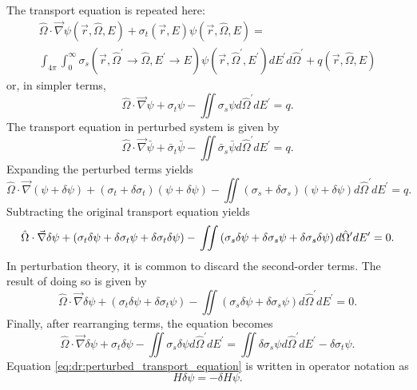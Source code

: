 The transport equation is repeated here:
\begin{multline*}
  \hat{\Omega}\cdot\vec{\nabla}\psi\left(\vec{r},\hat{\Omega},E\right) +
  \sigma_t\left(\vec{r},E\right)\psi\left(\vec{r},\hat{\Omega},E\right) = \\
  \int_{4\pi}\int_0^\infty\sigma_s\left(\vec{r},\hat{\Omega}^\prime\rightarrow\hat{\Omega},E^\prime\rightarrow E\right)\psi\left(\vec{r},\hat{\Omega}^\prime,E^\prime\right)dE^\prime d\hat{\Omega}^\prime +
  q\left(\vec{r},\hat{\Omega},E\right)
\end{multline*}
or, in simpler terms,
\begin{equation}\label{eq:dr:transport_equation_simple}
  \hat{\Omega}\cdot\vec{\nabla}\psi +
  \sigma_t\psi -
  \iint\sigma_s\psi d\hat{\Omega}^\prime dE^\prime =
  q.
\end{equation}
The transport equation in perturbed system is given by
\begin{equation}\label{eq:dr:transport_equation_perturbed}
  \hat{\Omega}\cdot\vec{\nabla}\bar{\psi} +
  \bar{\sigma}_t\bar{\psi} -
  \iint\bar{\sigma}_s\bar{\psi} d\hat{\Omega}^\prime dE^\prime =
  q.
\end{equation}
Expanding the perturbed terms yields
\begin{equation}\label{eq:dr:transport_equation_perturbed_2}
  \hat{\Omega}\cdot\vec{\nabla}\left(\psi + \delta\psi\right) +
  \left(\sigma_t + \delta\sigma_t\right)\left(\psi + \delta\psi\right) -
  \iint\left(\sigma_s + \delta\sigma_s\right)\left(\psi + \delta\psi\right)d\hat{\Omega}^\prime dE^\prime =
  q.
\end{equation}
Subtracting the original transport equation yields
\begin{equation}\label{eq:dr:transport_equation_perturbed_3}
  \hat{\Omega}\cdot\vec{\nabla}\delta\psi +
  \left(\sigma_t\delta\psi + \delta\sigma_t\psi + \delta\sigma_t\delta\psi\right) - \\
  \iint\left(\sigma_s\delta\psi + \delta\sigma_s\psi + \delta\sigma_s\delta\psi\right)d\hat{\Omega}^\prime dE^\prime =
  0.
\end{equation}
In perturbation theory, it is common to discard the second-order terms.
The result of doing so is given by
\begin{equation}\label{eq:dr:transport_equation_perturbed_4}
  \hat{\Omega}\cdot\vec{\nabla}\delta\psi +
  \left(\sigma_t\delta\psi + \delta\sigma_t\psi\right) -
  \iint\left(\sigma_s\delta\psi + \delta\sigma_s\psi\right)d\hat{\Omega}^\prime dE^\prime =
  0.
\end{equation}
Finally, after rearranging terms, the equation becomes
\begin{equation}\label{eq:dr:perturbed_transport_equation}
  \hat{\Omega}\cdot\vec{\nabla}\delta\psi +
  \sigma_t\delta\psi -
  \iint\sigma_s\delta\psi d\hat{\Omega}^\prime dE^\prime =
  \iint\delta\sigma_s\psi d\hat{\Omega}^\prime dE^\prime - \delta\sigma_t\psi.
\end{equation}
Equation \ref{eq:dr:perturbed_transport_equation} is written in operator notation as
\begin{equation}
  H\delta\psi = -\delta H\psi.
\end{equation}

